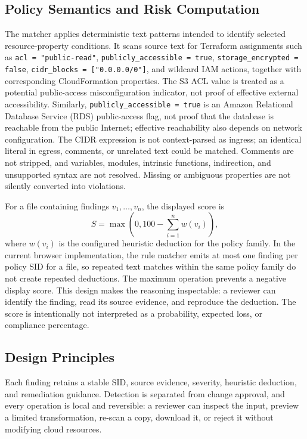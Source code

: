 \documentclass[conference]{IEEEtran}
\begin{document}
\subsection{Policy Semantics and Risk Computation}
The matcher applies deterministic text patterns intended to identify selected resource-property conditions. It scans source text for Terraform assignments such as \texttt{acl = "public-read"}, \texttt{publicly\_accessible = true}, \texttt{storage\_encrypted = false}, \texttt{cidr\_blocks = ["0.0.0.0/0"]}, and wildcard IAM actions, together with corresponding CloudFormation properties. The S3 ACL value is treated as a potential public-access misconfiguration indicator, not proof of effective external accessibility. Similarly, \texttt{publicly\_accessible = true} is an Amazon Relational Database Service (RDS) public-access flag, not proof that the database is reachable from the public Internet; effective reachability also depends on network configuration. The CIDR expression is not context-parsed as ingress; an identical literal in egress, comments, or unrelated text could be matched. Comments are not stripped, and variables, modules, intrinsic functions, indirection, and unsupported syntax are not resolved. Missing or ambiguous properties are not silently converted into violations.

For a file containing findings $v_1,\ldots,v_n$, the displayed score is
\begin{equation}
S=\max\left(0,100-\sum_{i=1}^{n}w(v_i)\right),
\end{equation}
where $w(v_i)$ is the configured heuristic deduction for the policy family. In the current browser implementation, the rule matcher emits at most one finding per policy SID for a file, so repeated text matches within the same policy family do not create repeated deductions. The maximum operation prevents a negative display score. This design makes the reasoning inspectable: a reviewer can identify the finding, read its source evidence, and reproduce the deduction. The score is intentionally not interpreted as a probability, expected loss, or compliance percentage.

\subsection{Design Principles}
Each finding retains a stable SID, source evidence, severity, heuristic deduction, and remediation guidance. Detection is separated from change approval, and every operation is local and reversible: a reviewer can inspect the input, preview a limited transformation, re-scan a copy, download it, or reject it without modifying cloud resources.
\end{document}
